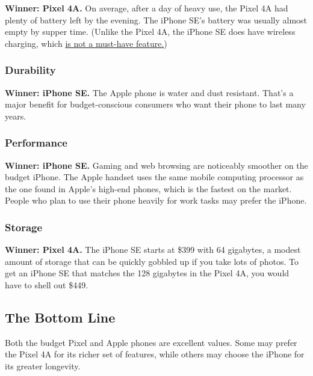 \textbf{Winner: Pixel 4A.} On average, after a day of heavy use, the
Pixel 4A had plenty of battery left by the evening. The iPhone SE's
battery was usually almost empty by supper time. (Unlike the Pixel 4A,
the iPhone SE does have wireless charging, which
\href{https://www.nytimes.com/2018/10/03/technology/personaltech/wireless-charging-pros-cons.html}{is
not a must-have feature.})

\hypertarget{durability}{%
\subsubsection{Durability}\label{durability}}

\textbf{Winner: iPhone SE.} The Apple phone is water and dust resistant.
That's a major benefit for budget-conscious consumers who want their
phone to last many years.

\hypertarget{performance}{%
\subsubsection{Performance}\label{performance}}

\textbf{Winner: iPhone SE.} Gaming and web browsing are noticeably
smoother on the budget iPhone. The Apple handset uses the same mobile
computing processor as the one found in Apple's high-end phones, which
is the fastest on the market. People who plan to use their phone heavily
for work tasks may prefer the iPhone.

\hypertarget{storage}{%
\subsubsection{Storage}\label{storage}}

\textbf{Winner: Pixel 4A.} The iPhone SE starts at \$399 with 64
gigabytes, a modest amount of storage that can be quickly gobbled up if
you take lots of photos. To get an iPhone SE that matches the 128
gigabytes in the Pixel 4A, you would have to shell out \$449.

\hypertarget{the-bottom-line}{%
\subsection{The Bottom Line}\label{the-bottom-line}}

Both the budget Pixel and Apple phones are excellent values. Some may
prefer the Pixel 4A for its richer set of features, while others may
choose the iPhone for its greater longevity.

